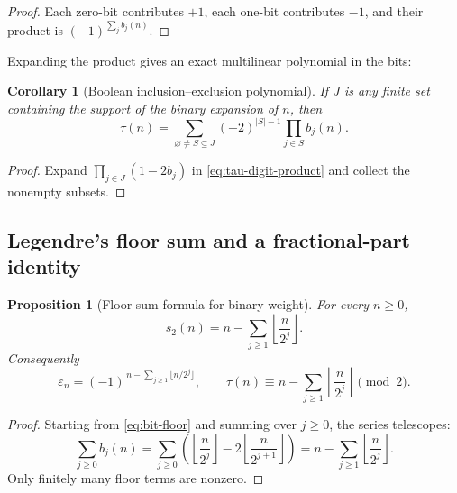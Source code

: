 \documentclass[11pt,oneside]{article}
\newtheorem{proposition}[theorem]{Proposition}
\newtheorem{corollary}[theorem]{Corollary}
\theoremstyle{definition}
\theoremstyle{remark}
\newcommand{\swt}{s_2}
\newcommand{\eps}{\varepsilon}
\newcommand{\1}{\mathbf 1}
\begin{document}
\begin{proof}
Each zero-bit contributes \(+1\), each one-bit contributes \(-1\), and their product is
\((-1)^{\sum_jb_j(n)}\).
\end{proof}

Expanding the product gives an exact multilinear polynomial in the bits:
\begin{corollary}[Boolean inclusion--exclusion polynomial]
\label{cor:boolean-poly}
If \(J\) is any finite set containing the support of the binary expansion of \(n\), then
\begin{equation}
 \tau(n)=
 \sum_{\varnothing\ne S\subseteq J}
 (-2)^{|S|-1}\prod_{j\in S}b_j(n).
 \label{eq:boolean-poly}
\end{equation}
\end{corollary}

\begin{proof}
Expand \(\prod_{j\in J}(1-2b_j)\) in \eqref{eq:tau-digit-product} and collect the nonempty
subsets.
\end{proof}

\subsection{Legendre's floor sum and a fractional-part identity}

\begin{proposition}[Floor-sum formula for binary weight]
\label{prop:floor-weight}
For every \(n\ge0\),
\begin{equation}
 \swt(n)=n-\sum_{j\ge1}\left\lfloor\frac{n}{2^j}\right\rfloor.
 \label{eq:weight-floor}
\end{equation}
Consequently
\begin{equation}
 \boxed{
 \eps_n=(-1)^{\,n-\sum_{j\ge1}\lfloor n/2^j\rfloor},
 \qquad
 \tau(n)\equiv n-\sum_{j\ge1}\left\lfloor\frac{n}{2^j}\right\rfloor\pmod2.}
 \label{eq:floor-sign}
\end{equation}
\end{proposition}

\begin{proof}
Starting from \eqref{eq:bit-floor} and summing over \(j\ge0\), the series telescopes:
\[
 \sum_{j\ge0}b_j(n)
 =\sum_{j\ge0}\left(\left\lfloor\frac n{2^j}\right\rfloor
       -2\left\lfloor\frac n{2^{j+1}}\right\rfloor\right)
 =n-\sum_{j\ge1}\left\lfloor\frac n{2^j}\right\rfloor.
\]
Only finitely many floor terms are nonzero.
\end{proof}
\end{document}
